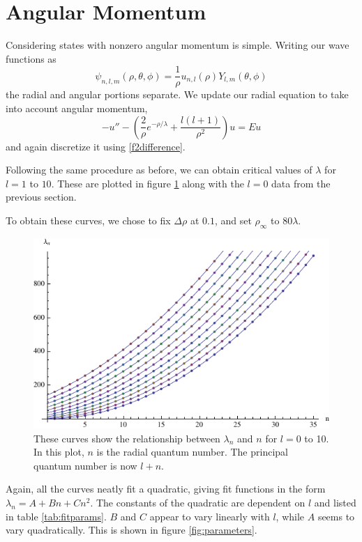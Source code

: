\documentclass[12pt,twoside]{reedthesis}
\newcommand{\eqn}[1]{\begin{equation}#1\end{equation}}
\begin{document}
\section{Angular Momentum}

Considering states with nonzero angular momentum is simple. Writing our wave functions as
\eqn{
\psi_{n,l,m} (\rho,\theta,\phi) = \frac{1}{\rho}u_{n,l}(\rho) Y_{l,m}(\theta, \phi)
}
the radial and angular portions separate. We update our radial equation to take into account angular momentum,
\eqn{
-u'' - \left(\frac{2}{\rho}e^{-\rho/\lambda} + \frac{l(l+1)}{\rho^2}\right) u = E u
\label{eq:angmomentum}
}
and again discretize it using \eqref{f2difference}. 

Following the same procedure as before, we can obtain critical values of $\lambda$ for $l = 1$ to $10$. These are plotted in figure \ref{fig:allthelcs} along with the $l = 0$ data from the previous section.

To obtain these curves, we chose to fix $\Delta \rho$ at $0.1$, and set $\rho_{\infty}$ to $80 \lambda$.

\begin{figure}[h]
\centering
\includegraphics{Figures/allthelcs}
\caption[Plots of $\lambda_n$ versus $n$ for $l = 0$ to $10$]{These curves show the relationship between $\lambda_n$ and $n$ for $l = 0$ to 10. In this plot, $n$ is the radial quantum number. The principal quantum number is now $l + n$.}
\label{fig:allthelcs}
\end{figure}

Again, all the curves neatly fit a quadratic, giving fit functions in the form $\lambda_n = A + B n + C n^2$. The constants of the quadratic are dependent on $l$ and listed in table \ref{tab:fitparams}. $B$ and $C$ appear to vary linearly with $l$, while $A$ seems to vary quadratically. This is shown in figure \ref{fig:parameters}.
\end{document}
